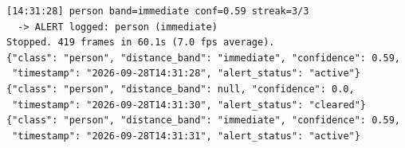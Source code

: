 \begin{verbatim}
[14:31:28] person band=immediate conf=0.59 streak=3/3
  -> ALERT logged: person (immediate)
Stopped. 419 frames in 60.1s (7.0 fps average).
{"class": "person", "distance_band": "immediate", "confidence": 0.59,
 "timestamp": "2026-09-28T14:31:28", "alert_status": "active"}
{"class": "person", "distance_band": null, "confidence": 0.0,
 "timestamp": "2026-09-28T14:31:30", "alert_status": "cleared"}
{"class": "person", "distance_band": "immediate", "confidence": 0.59,
 "timestamp": "2026-09-28T14:31:31", "alert_status": "active"}
\end{verbatim}
